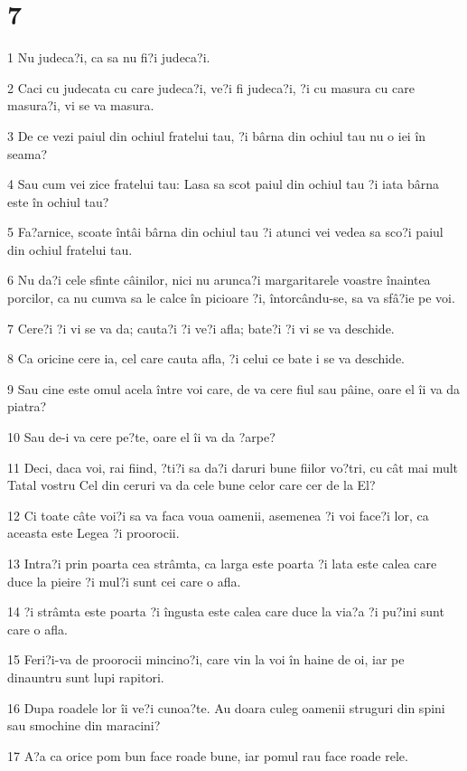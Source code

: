 \chapter{7}

\par 1 Nu judeca?i, ca sa nu fi?i judeca?i.
\par 2 Caci cu judecata cu care judeca?i, ve?i fi judeca?i, ?i cu masura cu care masura?i, vi se va masura.
\par 3 De ce vezi paiul din ochiul fratelui tau, ?i bârna din ochiul tau nu o iei în seama?
\par 4 Sau cum vei zice fratelui tau: Lasa sa scot paiul din ochiul tau ?i iata bârna este în ochiul tau?
\par 5 Fa?arnice, scoate întâi bârna din ochiul tau ?i atunci vei vedea sa sco?i paiul din ochiul fratelui tau.
\par 6 Nu da?i cele sfinte câinilor, nici nu arunca?i margaritarele voastre înaintea porcilor, ca nu cumva sa le calce în picioare ?i, întorcându-se, sa va sfâ?ie pe voi.
\par 7 Cere?i ?i vi se va da; cauta?i ?i ve?i afla; bate?i ?i vi se va deschide.
\par 8 Ca oricine cere ia, cel care cauta afla, ?i celui ce bate i se va deschide.
\par 9 Sau cine este omul acela între voi care, de va cere fiul sau pâine, oare el îi va da piatra?
\par 10 Sau de-i va cere pe?te, oare el îi va da ?arpe?
\par 11 Deci, daca voi, rai fiind, ?ti?i sa da?i daruri bune fiilor vo?tri, cu cât mai mult Tatal vostru Cel din ceruri va da cele bune celor care cer de la El?
\par 12 Ci toate câte voi?i sa va faca voua oamenii, asemenea ?i voi face?i lor, ca aceasta este Legea ?i proorocii.
\par 13 Intra?i prin poarta cea strâmta, ca larga este poarta ?i lata este calea care duce la pieire ?i mul?i sunt cei care o afla.
\par 14 ?i strâmta este poarta ?i îngusta este calea care duce la via?a ?i pu?ini sunt care o afla.
\par 15 Feri?i-va de proorocii mincino?i, care vin la voi în haine de oi, iar pe dinauntru sunt lupi rapitori.
\par 16 Dupa roadele lor îi ve?i cunoa?te. Au doara culeg oamenii struguri din spini sau smochine din maracini?
\par 17 A?a ca orice pom bun face roade bune, iar pomul rau face roade rele.
